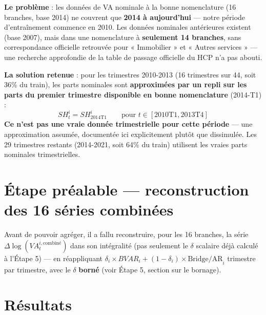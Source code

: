 \documentclass[11pt,a4paper]{article}
\begin{document}
\begin{alertebox}
\textbf{Le problème} : les données de VA nominale à la bonne nomenclature (16 branches, base 2014) ne couvrent que \textbf{2014 à aujourd'hui} --- notre période d'entraînement commence en 2010. Les données nominales antérieures existent (base 2007), mais dans une nomenclature à \textbf{seulement 14 branches}, sans correspondance officielle retrouvée pour « Immobilier » et « Autres services » --- une recherche approfondie de la table de passage officielle du HCP n'a pas abouti.

\textbf{La solution retenue} : pour les trimestres 2010-2013 (16 trimestres sur 44, soit 36\% du train), les parts nominales sont \textbf{approximées par un repli sur les parts du premier trimestre disponible en bonne nomenclature} (2014-T1) :
\begin{equation}
SH_t^i = SH_{\text{2014T1}}^i \qquad \text{pour } t \in [\text{2010T1}, \text{2013T4}]
\end{equation}
\textbf{Ce n'est pas une vraie donnée trimestrielle pour cette période} --- une approximation assumée, documentée ici explicitement plutôt que dissimulée. Les 29 trimestres restants (2014-2021, soit 64\% du train) utilisent les vraies parts nominales trimestrielles.
\end{alertebox}

\section{Étape préalable --- reconstruction des 16 séries combinées}

\begin{intuition}
Avant de pouvoir agréger, il a fallu reconstruire, pour les 16 branches, la série $\Delta\log(VA_t^{i,\text{combiné}})$ dans son intégralité (pas seulement le $\delta$ scalaire déjà calculé à l'Étape 5) --- en réappliquant $\delta_i \times BVAR_i + (1-\delta_i) \times \text{Bridge/AR}_i$ trimestre par trimestre, avec le $\delta$ \textbf{borné} (voir Étape 5, section sur le bornage).
\end{intuition}

\section{Résultats}
\end{document}

